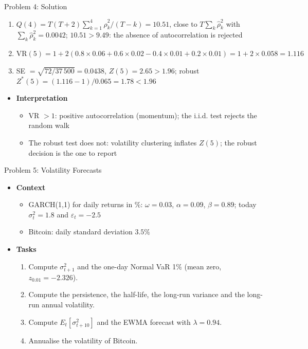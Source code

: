 \begin{frame}{Problem 4: Solution}
\itemsize{\footnotesize}
\begin{enumerate}
    \item $Q(4) = T(T+2)\sum_{k=1}^{4}\hat\rho_k^2/(T-k) = 10.51$, close to $T\sum_k\hat\rho_k^2$ with $\sum_k\hat\rho_k^2 = 0.0042$; $10.51 > 9.49$: the absence of autocorrelation is rejected
    \item $\mathrm{VR}(5) = 1 + 2(0.8 \times 0.06 + 0.6 \times 0.02 - 0.4 \times 0.01 + 0.2 \times 0.01) = 1 + 2 \times 0.058 = 1.116$
    \item SE $= \sqrt{72/37\,500} = 0.0438$, $Z(5) = 2.65 > 1.96$; robust $Z^*(5) = (1.116 - 1)/0.065 = 1.78 < 1.96$
\end{enumerate}
\begin{itemize}
    \item \textbf{Interpretation}
    \begin{itemize}
        \item VR $> 1$: positive autocorrelation (momentum); the i.i.d. test rejects the random walk
        \item The robust test does not: volatility clustering inflates $Z(5)$; the robust decision is the one to report
    \end{itemize}
\end{itemize}
\end{frame}

\begin{frame}{Problem 5: Volatility Forecasts}
\itemsize{\footnotesize}
\begin{itemize}
    \item \textbf{Context}
    \begin{itemize}
        \item GARCH(1,1) for daily returns in \%: $\omega = 0.03$, $\alpha = 0.09$, $\beta = 0.89$; today $\sigma_t^2 = 1.8$ and $\varepsilon_t = -2.5$
        \item Bitcoin: daily standard deviation $3.5\%$
    \end{itemize}
    \item \textbf{Tasks}
\begin{enumerate}
    \item Compute $\sigma_{t+1}^2$ and the one-day Normal VaR 1\% (mean zero, $z_{0.01} = -2.326$).
    \item Compute the persistence, the half-life, the long-run variance and the long-run annual volatility.
    \item Compute $E_t[\sigma_{t+10}^2]$ and the EWMA forecast with $\lambda = 0.94$.
    \item Annualise the volatility of Bitcoin.
\end{enumerate}
\end{itemize}
\end{frame}


